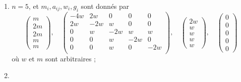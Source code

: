\begin{lemma}[Genre un]
\begin{enumerate}
$$\begin{matrix}
w & -2w & 0 & 0 & 0 \\
w & 0 & -2w & 0 & 0 \\
w & 0 & 0 & -2w & 0 \\
w & 0 & 0 & 0 & -2w \\
\end{matrix}
\right),
\quad
\left(
\begin{matrix}
w \\
w \\
w \\
w \\
w
\end{matrix}
\right),
\quad
\left(
\begin{matrix}
0 \\
0 \\
0 \\
0 \\
0
\end{matrix}
\right)
$$
où $w$ et $m$ sont arbitraires ;
\item
\label{item-triple-extended-up}
$n = 5$, et $m_i, a_{ij}, w_i, g_i$ sont donnés par
$$
\left(
\begin{matrix}
m \\
2m \\
2m \\
m \\
m
\end{matrix}
\right),
\quad
\left(
\begin{matrix}
-4w & 2w & 0 & 0 & 0 \\
2w & -2w & w & 0 & 0 \\
0 & w & -2w & w & w \\
0 & 0 & w & -2w & 0 \\
0 & 0 & w & 0 & -2w \\
\end{matrix}
\right),
\quad
\left(
\begin{matrix}
2w \\
w \\
w \\
w \\
w
\end{matrix}
\right),
\quad
\left(
\begin{matrix}
0 \\
0 \\
0 \\
0 \\
0
\end{matrix}
\right)
$$
où $w$ et $m$ sont arbitraires ;
\item
\label{item-triple-extended-down}

\end{enumerate}
\end{lemma}
